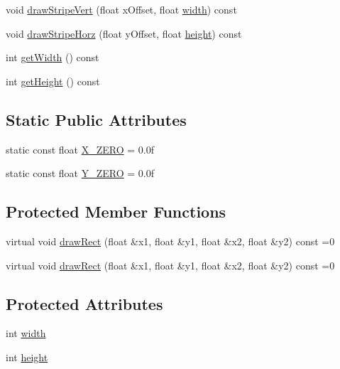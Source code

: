 \begin{DoxyCompactItemize}
\item 
void \hyperlink{class_renderer___a_af817037b1ebd9906e5f4faee1637bdf0}{draw\-Stripe\-Vert} (float x\-Offset, float \hyperlink{class_renderer___a_a0ca3fbb31eb776ee00b70536f267dfe7}{width}) const 
\item 
void \hyperlink{class_renderer___a_a70ea4a1396787e8a3c59c848a6aeabcd}{draw\-Stripe\-Horz} (float y\-Offset, float \hyperlink{class_renderer___a_a36d0dfb8eeccad9e1ff0b0c461632f6a}{height}) const 
\item 
int \hyperlink{class_renderer___a_a79fb640a6c4a733647f3bc5cd96c3bad}{get\-Width} () const 
\item 
int \hyperlink{class_renderer___a_a69aeb74354637f5d9d7a5508f00dde33}{get\-Height} () const 
\end{DoxyCompactItemize}
\subsection*{Static Public Attributes}
\begin{DoxyCompactItemize}
\item 
static const float \hyperlink{class_renderer___a_aeab3b86fbef2f719f01fdbf0792d4848}{X\-\_\-\-Z\-E\-R\-O} = 0.\-0f
\item 
static const float \hyperlink{class_renderer___a_ac2d79b93854681441cb48f96cb7e9f93}{Y\-\_\-\-Z\-E\-R\-O} = 0.\-0f
\end{DoxyCompactItemize}
\subsection*{Protected Member Functions}
\begin{DoxyCompactItemize}
\item 
virtual void \hyperlink{class_renderer___a_aaaec84a39a7a49825b7513c12812740d}{draw\-Rect} (float \&x1, float \&y1, float \&x2, float \&y2) const =0
\item 
virtual void \hyperlink{class_renderer___a_aaaec84a39a7a49825b7513c12812740d}{draw\-Rect} (float \&x1, float \&y1, float \&x2, float \&y2) const =0
\end{DoxyCompactItemize}
\subsection*{Protected Attributes}
\begin{DoxyCompactItemize}
\item 
int \hyperlink{class_renderer___a_a0ca3fbb31eb776ee00b70536f267dfe7}{width}
\item 
int \hyperlink{class_renderer___a_a36d0dfb8eeccad9e1ff0b0c461632f6a}{height}
\end{DoxyCompactItemize}


